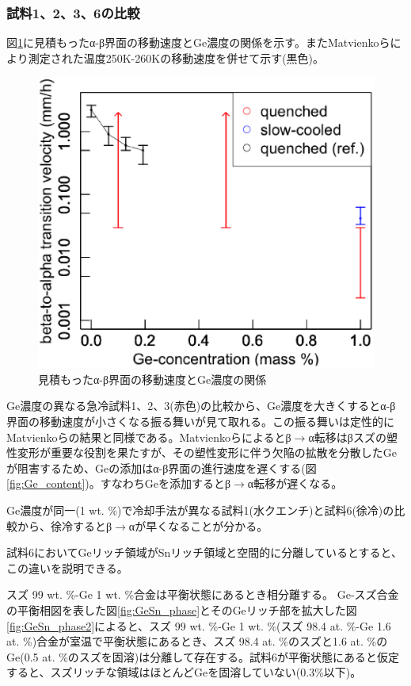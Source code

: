 \subsubsection{試料1、2、3、6の比較}
図\ref{fig:Transtionvelocity_beta_to_alpha}に見積もったα-β界面の移動速度とGe濃度の関係を示す。またMatvienkoら\cite{Matvienko}により測定された温度250K-260Kの移動速度を併せて示す(黒色)。
\begin{figure}[!h]
    \begin{center}
   \includegraphics[width=0.6\hsize]{samples/Transtionvelocity_beta_to_alpha.eps}
  \end{center}
  \caption{見積もったα-β界面の移動速度とGe濃度の関係}
  \label{fig:Transtionvelocity_beta_to_alpha}
\end{figure}

Ge濃度の異なる急冷試料1、2、3(赤色)の比較から、Ge濃度を大きくするとα-β界面の移動速度が小さくなる振る舞いが見て取れる。この振る舞いは定性的にMatvienkoら\cite{Matvienko}の結果と同様である。Matvienkoら\cite{Matvienko}によるとβ$\to$α転移はβスズの塑性変形が重要な役割を果たすが、その塑性変形に伴う欠陥の拡散を分散したGeが阻害するため、Geの添加はα-β界面の進行速度を遅くする(図\ref{fig:Ge_content})。すなわちGeを添加するとβ$\to$α転移が遅くなる。%

Ge濃度が同一(1 wt. \%)で冷却手法が異なる試料1(水クエンチ)と試料6(徐冷)の比較から、徐冷するとβ$\to$αが早くなることが分かる。

試料6においてGeリッチ領域がSnリッチ領域と空間的に分離しているとすると、この違いを説明できる。

スズ 99 wt. \%-Ge 1 wt. \%合金は平衡状態にあるとき相分離する。
Ge-スズ合金の平衡相図を表した図\ref{fig:GeSn_phase}とそのGeリッチ部を拡大した図\ref{fig:GeSn_phase2}によると、スズ 99 wt. \%-Ge 1 wt. \%(スズ 98.4 at. \%-Ge 1.6 at. \%)合金が室温で平衡状態にあるとき、スズ 98.4 at. \%のスズと1.6 at. \%のGe(0.5 at. \%のスズを固溶)は分離して存在する。試料6が平衡状態にあると仮定すると、スズリッチな領域はほとんどGeを固溶していない(0.3\%以下\cite{Thurmond1960})。

